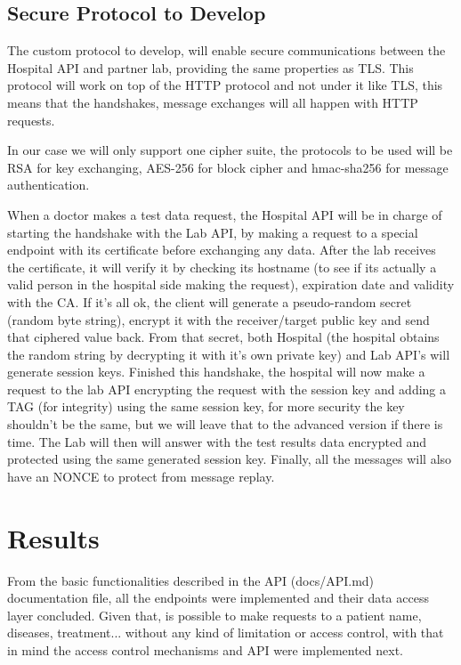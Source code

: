 \subsection{Secure Protocol to Develop}
The custom protocol to develop, will enable secure communications between the Hospital API and partner lab, providing the same properties as TLS.
This protocol will work on top of the HTTP protocol and not under it like TLS, this means that the handshakes, message exchanges will all happen with HTTP requests.

In our case we will only support one cipher suite, the protocols to be used will be RSA for key exchanging, AES-256 for block cipher and hmac-sha256 for message authentication.

When a doctor makes a test data request, the Hospital API will be in charge of starting the handshake with the Lab API, by making a request to a special endpoint with its certificate before exchanging any data.  After the lab receives the certificate, it will verify it by checking its hostname (to see if its actually a valid person in the hospital side making the request), expiration date and validity with the CA. If it's all ok, the client will generate a pseudo-random secret (random byte string), encrypt it with the receiver/target public key and send that ciphered value back. From that secret, both Hospital (the hospital obtains the random string by decrypting it with it's own private key) and Lab API's will generate session keys. Finished this handshake, the hospital will now make a request to the lab API encrypting the request with the session key and adding a TAG (for integrity) using the same session key, for more security the key shouldn't be the same, but we will leave that to the advanced version if there is time. The Lab will then will answer with the test results data encrypted and protected using the same generated session key. Finally, all the messages will also have an NONCE to protect from message replay. \\


\section{Results}

From the basic functionalities described in the API (docs/API.md) documentation file, all the endpoints were implemented and their data access layer concluded. Given that, is possible to make requests to a patient name, diseases, treatment... without any kind of limitation or access control, with that in mind the access control mechanisms and API were implemented next. \\

